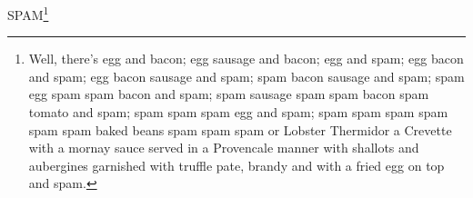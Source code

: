 
SPAM\footnote{Well, there's egg and bacon; egg sausage and bacon; egg and spam; egg bacon and spam; egg bacon sausage and spam; spam bacon sausage and spam; spam egg spam spam bacon and spam; spam sausage spam spam bacon spam tomato and spam; spam spam spam egg and spam; spam spam spam spam spam spam baked beans spam spam spam or Lobster Thermidor a Crevette with a mornay sauce served in a Provencale manner with shallots and aubergines garnished with truffle pate, brandy and with a fried egg on top and spam.}
